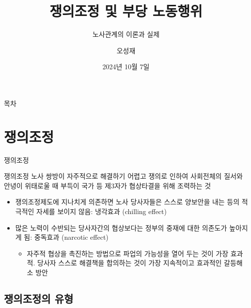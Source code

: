 \documentclass[aspectratio=169,xcolor=dvipsnames,handout]{beamer}
\title{쟁의조정 및 부당 노동행위}
\subtitle{노사관계의 이론과 실제}
\author{오성재}
\institute[CNU]
{\relax
    충남대학교 경제학과\\
}
\date{2024년 10월 7일}
\begin{document}

\frame{\titlepage}

\begin{frame}{목차}
    \small
    \tableofcontents
\end{frame}

\section{쟁의조정}

\begin{frame}{쟁의조정}
    \begin{block}{쟁의조정}
        노사 쌍방이 자주적으로 해결하기 어렵고 쟁의로 인하여 사회전체의 질서와 안녕이 위태로울 때 부득이 국가 등 제3자가 협상타결을 위해 조력하는 것
    \end{block}
    \begin{itemize}[<+->]
        \item 쟁의조정제도에 지나치게 의존하면 노사 당사자들은 스스로 양보안을 내는 등의 적극적인 자세를 보이지 않음: 냉각효과 (chilling effect)
        \item 많은 노력이 수반되는 당사자간의 협상보다는 정부의 중재에 대한 의존도가 높아지게 됨: 중독효과 (narcotic effect)
        \begin{itemize}[<+->]
            \item 자주적 협상을 촉진하는 방법으로 파업의 가능성을 열어 두는 것이 가장 효과적. 당사자 스스로 해결책을 합의하는 것이 가장 지속적이고 효과적인 갈등해소 방안
        \end{itemize}
    \end{itemize}
\end{frame}

\subsection{쟁의조정의 유형}
\end{document}
